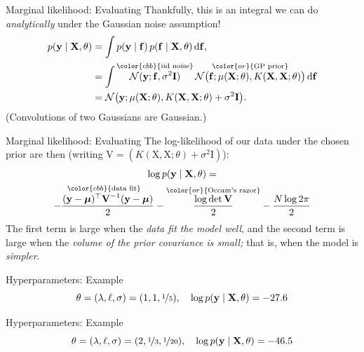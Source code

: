 \documentclass[xcolor={dvipsnames},hyperref={breaklinks=true},12pt]{beamer}
\newcommand{\given}{\mid}
\newcommand{\mc}[1]{\mathcal{#1}}
\newcommand{\intd}[1]{\,\mathrm{d}{#1}}
\newcommand{\trans}{^\top}
\newcommand{\mat}[1]{\bm{\mathrm{#1}}}
\renewcommand{\vec}[1]{\bm{\mathrm{#1}}}
\newcommand{\emphr}[1]{{\textcolor{or}{\itshape #1}}}
\newcommand{\maker}[1]{{\color{or}{#1}}}
\newcommand{\makeb}[1]{{\color{cbb}{#1}}}
\begin{document}
\begin{frame}{Marginal likelihood: Evaluating}
  Thankfully, this is an integral we can do \emphr{analytically} under
  the Gaussian noise assumption!
  \begin{align*}
    p(\vec{y} \given \mat{X}, \theta)
    &=
    \int p(\vec{y} \given \vec{f}) \, p(\vec{f} \given \mat{X}, \theta) \intd{\vec{f}},
    \\
    &=
    \int \overset{\makeb{\text{iid noise}}}{\mc{N}(\vec{y}; \vec{f}, \sigma^2 \vec{I})} \,
    \overset{\maker{\text{GP prior}}}{\mc{N}\bigl(\vec{f}; \mu(\mat{X}; \theta), K(\mat{X}, \mat{X}; \theta) \bigr)} \intd{\vec{f}}
    \\
    &=
    \mc{N}\bigl(\vec{y}; \mu(\mat{X}; \theta), K(\mat{X}, \mat{X}; \theta) + \sigma^2 \vec{I}\bigr).
  \end{align*}
  (Convolutions of two Gaussians are Gaussian.)
\end{frame}

\begin{frame}{Marginal likelihood: Evaluating}
  The log-likelihood of our data under the chosen prior are then
  (writing $\vec{V} = (K(\mat{X}, \mat{X}; \theta) + \sigma^2 \vec{I})$):
  \begin{multline*}
    \log p(\vec{y} \given \vec{\mat{X}}, \theta) =
    \\
    \overset{\makeb{\text{data fit}}}
            {-\frac{(\vec{y} - \vec{\mu})\trans\vec{V}^{-1}(\vec{y} - \vec{\mu})}{2}}
            -
    \overset{\maker{\text{Occam's razor}}}
            {\frac{\log \det \vec{V}}{2}}
            - \frac{N \log 2\pi}{2}
  \end{multline*}
  The first term is large when the \emphr{data fit the model well},
  and the second term is large when the \emphr{volume of the prior
    covariance is small;} that is, when the model is \emphr{simpler}.
\end{frame}

\begin{frame}{Hyperparameters: Example}
  \hspace*{-1.5em}
  \begin{equation*}
    \theta = (\lambda, \ell, \sigma) = (1, 1, \nicefrac{1}{5}),
    \quad
    \log p(\vec{y} \given \mat{X}, \theta) = -27.6
  \end{equation*}
\end{frame}

\begin{frame}{Hyperparameters: Example}
  \hspace*{-1.5em}
  \begin{equation*}
    \theta = (\lambda, \ell, \sigma) = (2, \nicefrac{1}{3}, \nicefrac{1}{20}),
    \quad
    \log p(\vec{y} \given \mat{X}, \theta) = -46.5
  \end{equation*}
\end{frame}
\end{document}
